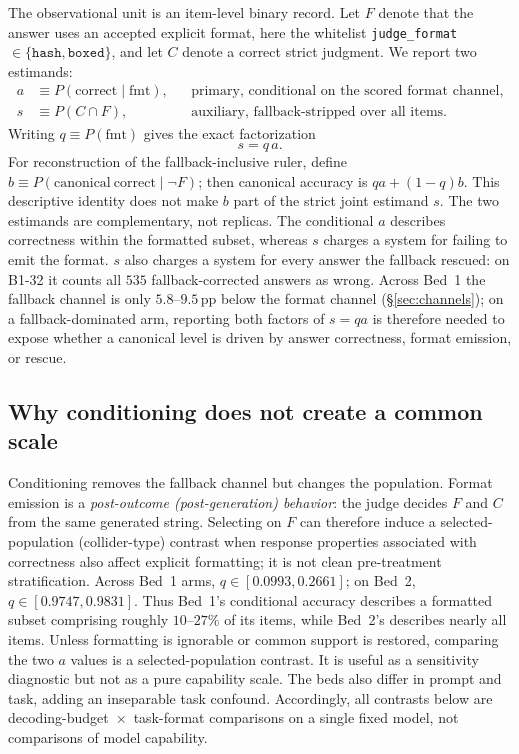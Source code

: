 \documentclass{article}
\newcommand{\Pfmt}{P(\mathrm{fmt})}
\newcommand{\PcFmt}{P(\mathrm{correct}\mid\mathrm{fmt})}
\newcommand{\pp}{\,\mathrm{pp}}
\begin{document}
The observational unit is an item-level binary record.  Let $F$ denote that
the answer uses an accepted explicit format, here the whitelist
\texttt{judge\_format}$\in\{\texttt{hash},\texttt{boxed}\}$, and let $C$ denote
a correct strict judgment.  We report two estimands:
\begin{align}
  a &\equiv \PcFmt, &&\text{primary, conditional on the scored format channel},
  \label{eq:conditional}\\
  s &\equiv P(C\cap F), &&\text{auxiliary, fallback-stripped over all items}.
  \label{eq:strict}
\end{align}
Writing $q\equiv\Pfmt$ gives the exact factorization
\begin{equation}
  s=q\,a.
  \label{eq:factorization}
\end{equation}
For reconstruction of the fallback-inclusive ruler, define
$b\equiv P(\mathrm{canonical\ correct}\mid\neg F)$; then canonical accuracy is
$qa+(1-q)b$.  This descriptive identity does not make $b$ part of the strict
joint estimand $s$.
The two estimands are complementary, not replicas.  The conditional $a$
describes correctness within the formatted subset, whereas $s$ charges a
system for failing to emit the format.  $s$ also charges a system for every
answer the fallback rescued: on \textsc{B1-32} it counts all $535$
fallback-corrected answers as wrong.  Across Bed~1 the fallback channel is only
$5.8$--$9.5\pp$ below the format channel (\S\ref{sec:channels}); on a
fallback-dominated arm, reporting both factors of $s=qa$ is therefore needed
to expose whether a canonical level is driven by answer correctness, format
emission, or rescue.

\subsection{Why conditioning does not create a common scale}
\label{sec:selection}

Conditioning removes the fallback channel but changes the population.  Format
emission is a \emph{post-outcome (post-generation) behavior}: the judge decides
$F$ and $C$ from the same generated string.  Selecting on $F$ can therefore
induce a selected-population (collider-type) contrast when response properties
associated with correctness also affect explicit formatting; it is not clean
pre-treatment stratification.  Across
Bed~1 arms, $q\in[0.0993,0.2661]$; on Bed~2,
$q\in[0.9747,0.9831]$. Thus Bed~1's conditional accuracy describes a formatted
subset comprising roughly $10$--$27\%$ of its items, while Bed~2's describes
nearly all items.
Unless formatting is ignorable or common support is restored, comparing the
two $a$ values is a selected-population contrast.  It is useful as a
sensitivity diagnostic but not as a pure capability scale.  The beds also
differ in prompt and task, adding an inseparable task confound.  Accordingly,
all contrasts below are decoding-budget~$\times$~task-format comparisons on a
single fixed model, not comparisons of model capability.
\end{document}
